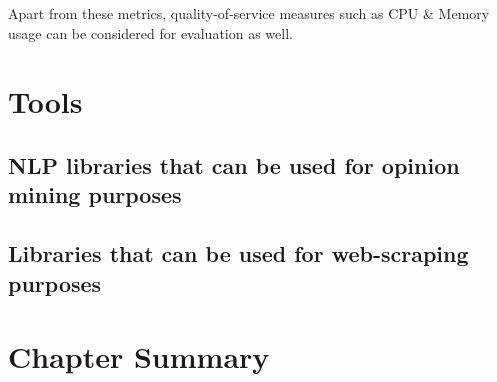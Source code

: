 



Apart from these metrics, quality-of-service measures such as CPU \& Memory usage can be considered for evaluation as well.



\section{Tools}
\subsection{NLP libraries that can be used for opinion mining purposes}


\subsection{Libraries that can be used for web-scraping purposes}

\section{Chapter Summary}
